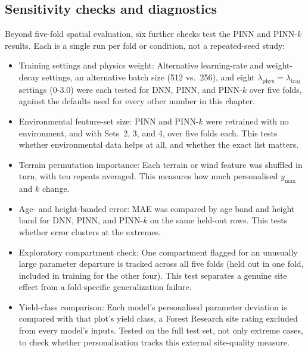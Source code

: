 \documentclass[logo,msc,ai]{infthesis}           %
\begin{document}
\subsection*{Sensitivity checks and diagnostics}
Beyond five-fold spatial evaluation, six further checks test the PINN and PINN-$k$ results. Each is a single run per fold or condition, not a repeated-seed study:
\begin{itemize}
\setlength\itemsep{0pt}
\item Training settings and physics weight: Alternative learning-rate and weight-decay settings, an alternative batch size (512 vs.\ 256), and eight $\lambda_{\mathrm{phys}}=\lambda_{\mathrm{traj}}$ settings (0-3.0) were each tested for DNN, PINN, and PINN-$k$ over five folds, against the defaults used for every other number in this chapter.
\item Environmental feature-set size: PINN and PINN-$k$ were retrained with no environment, and with Sets~2, 3, and 4, over five folds each. This tests whether environmental data helps at all, and whether the exact list matters.
\item Terrain permutation importance: Each terrain or wind feature was shuffled in turn, with ten repeats averaged. This measures how much personalised $y_{\max}$ and $k$ change.
\item Age- and height-banded error: MAE was compared by age band and height band for DNN, PINN, and PINN-$k$ on the same held-out rows. This tests whether error clusters at the extremes.
\item Exploratory compartment check: One compartment flagged for an unusually large parameter departure is tracked across all five folds (held out in one fold, included in training for the other four). This test separates a genuine site effect from a fold-specific generalization failure.
\item Yield-class comparison: Each model's personalised parameter deviation is compared with that plot's yield class, a Forest Research site rating excluded from every model's inputs. Tested on the full test set, not only extreme cases, to check whether personalisation tracks this external site-quality measure.
\end{itemize}
\end{document}
